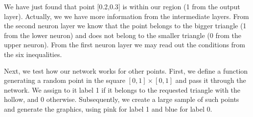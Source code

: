 \documentclass[a4paper,12pt,polish]{jupyterBook}
\begin{document}
\sphinxAtStartPar
We have just found that point {[}0.2,0.3{]} is within our region (1 from the output layer). Actually, we we have more information from the intermediate layers. From the second neuron layer we know that the point belongs to the bigger triangle (1 from the lower neuron) and does not belong to the smaller triangle (0 from the upper neuron). From the first neuron layer we may read out the conditions from the six inequalities.

\sphinxAtStartPar
Next, we test how our network works for other points. First, we define a function generating a  random point in the square \([0,1]\times [0,1]\) and pass it through the network. We assign to it label 1 if it belongs to the requested triangle with the hollow, and 0 otherwise. Subsequently, we create a large sample of such points and generate the graphics, using pink for label 1 and blue for label 0.
\begin{sphinxVerbatimInput}

\begin{sphinxVerbatim}[commandchars=\\\{\}]
 
    \PYG{p}{[}\PYG{p}{]} 
                 
     \PYG{p}{[}\PYG{p}{[}\PYG{p}{]}\PYG{p}{[}\PYG{p}{]}\PYG{p}{[}\PYG{p}{]}\PYG{p}{[}\PYG{p}{]}\PYG{p}{]}               
\end{sphinxVerbatim}
\end{sphinxVerbatimInput}
\begin{sphinxVerbatimInput}

\begin{sphinxVerbatim}[commandchars=\\\{\}]
\PYG{p}{[}    \PYG{p}{]}
\PYG{p}{[}\PYG{p}{]}
\end{sphinxVerbatim}
\end{sphinxVerbatimInput}
\end{document}
